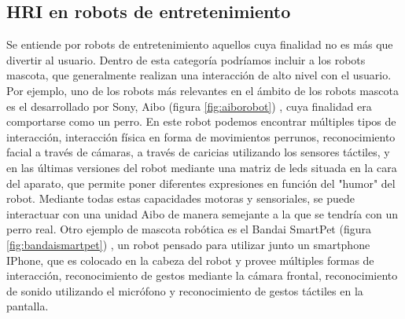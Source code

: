  \subsection{HRI en robots de entretenimiento}
 Se entiende por robots de entretenimiento aquellos cuya finalidad no es más que divertir al usuario. Dentro de esta categoría podríamos incluir a los robots mascota, que generalmente realizan una interacción de alto nivel con el usuario.
 Por ejemplo, uno de los robots más relevantes en el ámbito de los robots mascota es el desarrollado por Sony, Aibo \cite{aibo} (figura \ref{fig:aiborobot}) , cuya finalidad era comportarse como un perro. En este robot podemos encontrar múltiples tipos de interacción, interacción física en forma de movimientos perrunos, reconocimiento facial a través de cámaras, a través de caricias utilizando los sensores táctiles, y en las últimas versiones del robot mediante una matriz de leds situada en la cara del aparato, que permite poner diferentes expresiones en función del "humor" del robot. Mediante todas estas capacidades motoras y sensoriales, se puede interactuar con una unidad Aibo de manera semejante a la que se tendría con un perro real.
 Otro ejemplo de mascota robótica es el Bandai SmartPet (figura \ref{fig:bandaismartpet}) , un robot pensado para utilizar junto un smartphone IPhone, que es colocado en la cabeza del robot y provee múltiples formas de interacción, reconocimiento de gestos mediante la cámara frontal, reconocimiento de sonido utilizando el micrófono y reconocimiento de gestos táctiles en la pantalla.
 


